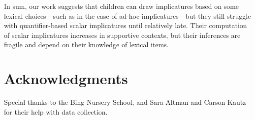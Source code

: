 \documentclass[10pt,letterpaper]{article}
\begin{document}

In sum, our work suggests that children can draw implicatures based on some lexical choices---such as in the case of ad-hoc implicatures---but they still struggle with quantifier-based scalar implicatures until relatively late. Their computation of scalar implicatures increases in supportive contexts, but their inferences are fragile and depend on their knowledge of lexical items.

\section{Acknowledgments}

Special thanks to the Bing Nursery School, and Sara Altman and Carson Kautz for their help with data collection. 



\setlength{\bibleftmargin}{.125in} \setlength{\bibindent}{-\bibleftmargin}


\end{document}
